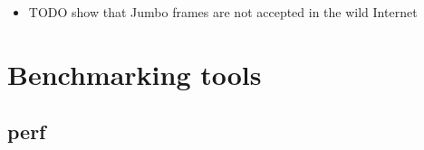 \documentclass[12pt,a4paper,twoside,openright]{report}
\begin{document}
\begin{itemize}
\begin{table}[ht]
    \centering
    \caption{Impact of Jumbo frames on the throughput of \texttt{ngtcp2} completion time required to transfer specified files. In particular, this experiment measures QUIC throughput between the server and the client when they are pinned to two different cores on the same machine, and their packets travel via an intermediate machine (as demonstrated in Figure~\ref{fig:Physical_testing_environment}).
    Furthermore, a server uses a single thread, only a single stream is used, and a single file transfer is performed for each experiment.
    }
    \label{fig:Impact_of_Jumbo_frames_for_ngtcp2_throughput}
\end{table}






























  
  
  
  \item TODO show that Jumbo frames are not accepted in the wild Internet
\end{itemize}


\section{Benchmarking tools}


\subsection{perf}
\end{document}
